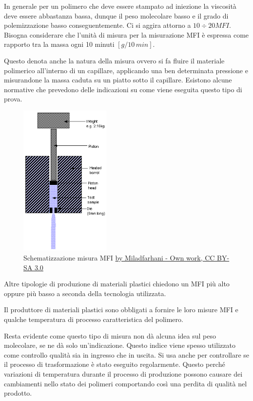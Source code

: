 In generale per un polimero che deve essere stampato ad iniezione la viscosità deve essere abbastanza bassa, dunque il peso molecolare basso e il grado di polemizzazione basso conseguentemente. Ci si aggira attorno a $10\div20\unit{MFI}$.
Bisogna considerare che l'unità di misura per la misurazione \ac{MFI} è espressa come rapporto tra la massa ogni 10 minuti $\left[g/10\,min\right]$.

Questo denota anche la natura della misura ovvero si fa fluire il materiale polimerico all'interno di un capillare, applicando una ben determinata pressione e misurandone la massa caduta su un piatto sotto il capillare. Esistono alcune normative che prevedono delle indicazioni su come viene eseguita questo tipo di prova.

\begin{figure}
\centering
\includegraphics[width = 0.4\textwidth]{gfx/MFI}
\caption{Schematizzazione misura \ac{MFI} \href{https://commons.wikimedia.org/w/index.php?curid=33527584}{by Miladfarhani - Own work, CC BY-SA 3.0}}
\label{fig:MFI}
\end{figure}

Altre tipologie di produzione di materiali plastici chiedono un \ac{MFI} più alto oppure più basso a seconda della tecnologia utilizzata.

Il produttore di materiali plastici sono obbligati a fornire le loro misure \ac{MFI} e qualche temperatura di processo caratteristica del polimero.

Resta evidente come questo tipo di misura non dà alcuna idea sul peso molecolare, se ne dà solo un'indicazione.
Questo indice viene spesso utilizzato come controllo qualità sia in ingresso che in uscita. Si usa anche per controllare se il processo di trasformazione è stato eseguito regolarmente.
Questo perché variazioni di temperatura durante il processo di produzione possono causare dei cambiamenti nello stato dei polimeri comportando così una perdita di qualità nel prodotto. 

